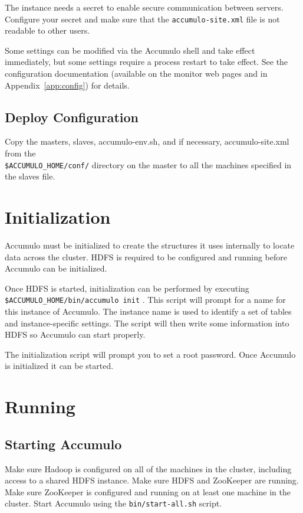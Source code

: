 The instance needs a secret to enable secure communication between servers. Configure your
secret and make sure that the \texttt{accumulo-site.xml} file is not readable to other users.

Some settings can be modified via the Accumulo shell and take effect immediately, but
some settings require a process restart to take effect. See the configuration documentation
(available on the monitor web pages and in Appendix~\ref{app:config}) for details.

\subsection{Deploy Configuration}

Copy the masters, slaves, accumulo-env.sh, and if necessary, accumulo-site.xml
from the\\\texttt{\$ACCUMULO\_HOME/conf/} directory on the master to all the machines
specified in the slaves file.

\section{Initialization}

Accumulo must be initialized to create the structures it uses internally to locate
data across the cluster. HDFS is required to be configured and running before
Accumulo can be initialized.

Once HDFS is started, initialization can be performed by executing\\
\texttt{\$ACCUMULO\_HOME/bin/accumulo init} . This script will prompt for a name
for this instance of Accumulo. The instance name is used to identify a set of tables
and instance-specific settings. The script will then write some information into
HDFS so Accumulo can start properly.

The initialization script will prompt you to set a root password. Once Accumulo is
initialized it can be started.

\section{Running}

\subsection{Starting Accumulo}

Make sure Hadoop is configured on all of the machines in the cluster, including
access to a shared HDFS instance. Make sure HDFS and ZooKeeper are running.
Make sure ZooKeeper is configured and running on at least one machine in the
cluster.
Start Accumulo using the \texttt{bin/start-all.sh} script.

